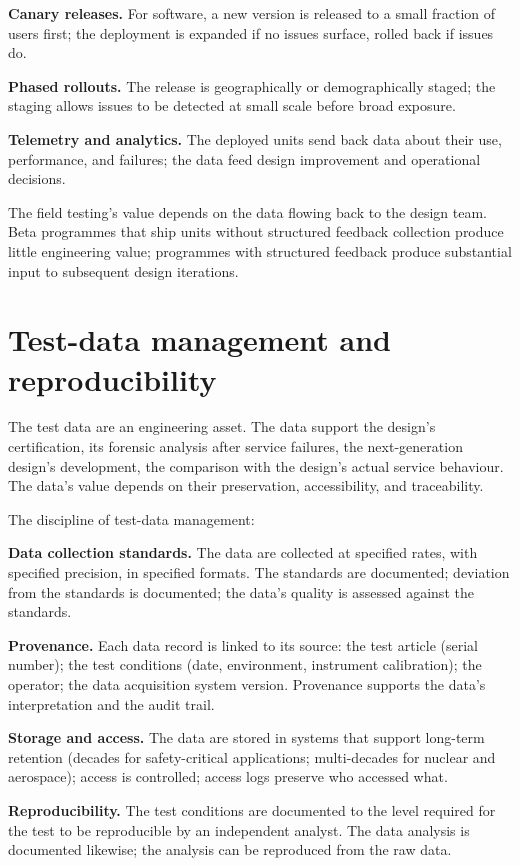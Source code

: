 \textbf{Canary releases.} For software, a new version is released to a small fraction of users first; the deployment is expanded if no issues surface, rolled back if issues do.

\textbf{Phased rollouts.} The release is geographically or demographically staged; the staging allows issues to be detected at small scale before broad exposure.

\textbf{Telemetry and analytics.} The deployed units send back data about their use, performance, and failures; the data feed design improvement and operational decisions.

The field testing's value depends on the data flowing back to the design team. Beta programmes that ship units without structured feedback collection produce little engineering value; programmes with structured feedback produce substantial input to subsequent design iterations.

\section{Test-data management and reproducibility}

The test data are an engineering asset. The data support the design's certification, its forensic analysis after service failures, the next-generation design's development, the comparison with the design's actual service behaviour. The data's value depends on their preservation, accessibility, and traceability.

The discipline of test-data management:

\textbf{Data collection standards.} The data are collected at specified rates, with specified precision, in specified formats. The standards are documented; deviation from the standards is documented; the data's quality is assessed against the standards.

\textbf{Provenance.} Each data record is linked to its source: the test article (serial number); the test conditions (date, environment, instrument calibration); the operator; the data acquisition system version. Provenance supports the data's interpretation and the audit trail.

\textbf{Storage and access.} The data are stored in systems that support long-term retention (decades for safety-critical applications; multi-decades for nuclear and aerospace); access is controlled; access logs preserve who accessed what.

\textbf{Reproducibility.} The test conditions are documented to the level required for the test to be reproducible by an independent analyst. The data analysis is documented likewise; the analysis can be reproduced from the raw data.

